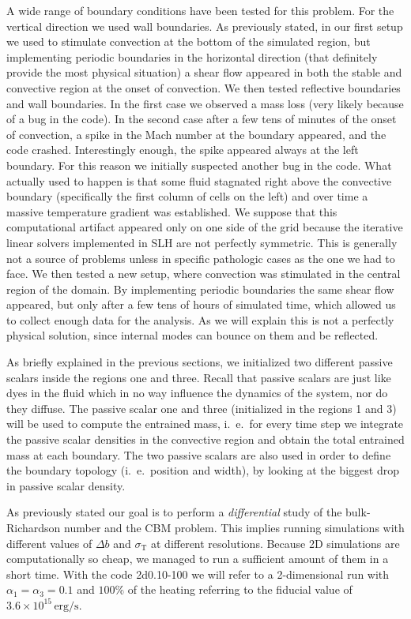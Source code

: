 A wide range of boundary conditions have been tested for this problem. For the vertical direction we used wall boundaries. As previously stated, in our first setup we used to stimulate convection at the bottom of the simulated region, but implementing periodic boundaries in the horizontal direction (that definitely provide the most physical situation) a shear flow appeared in both the stable and convective region at the onset of convection. We then tested reflective boundaries and wall boundaries. In the first case we observed a mass loss (very likely because of a bug in the code). In the second case after a few tens of minutes of the onset of convection, a spike in the Mach number at the boundary appeared, and the code crashed. Interestingly enough, the spike appeared always at the left boundary. For this reason we initially suspected another bug in the code. What actually used to happen is that some fluid stagnated right above the convective boundary (specifically the first column of cells on the left) and over time a massive temperature gradient was established. We suppose that this computational artifact appeared only on one side of the grid because the iterative linear solvers implemented in SLH are not perfectly symmetric. This is generally not a source of problems unless in specific pathologic cases as the one we had to face. We then tested a new setup, where convection was stimulated in the central region of the domain. By implementing periodic boundaries the same shear flow appeared, but only after a few tens of hours of simulated time, which allowed us to collect enough data for the analysis. As we will explain this is not a perfectly physical solution, since internal modes can bounce on them and be reflected.


As briefly explained in the previous sections, we initialized two different passive scalars inside the regions one and three. Recall that passive scalars are just like dyes in the fluid which in no way influence the dynamics of the system, nor do they diffuse. The passive scalar one and three (initialized in the regions 1 and 3) will be used to compute the entrained mass, i.\ e.\ for every time step we integrate the passive scalar densities in the convective region and obtain the total entrained mass at each boundary. The two passive scalars are also used in order to define the boundary topology (i.\ e.\  position and width), by looking at the biggest drop in passive scalar density.

As previously stated our goal is to perform a \textit{differential} study of the bulk-Richardson number and the CBM problem. This implies running simulations with different values of $\Delta b$ and $\sigma_{\mathrm{T}}$ at different resolutions. Because 2D simulations are computationally so cheap, we managed to run a  sufficient amount of them in a short time. With the code 2d0.10-100 we will refer to a 2-dimensional run with $\alpha_{1} = \alpha_{3}=0.1$ and $100 \%$ of the heating referring to the fiducial value of $3.6 \times 10^{15} \, \mathrm{erg/s}$.

